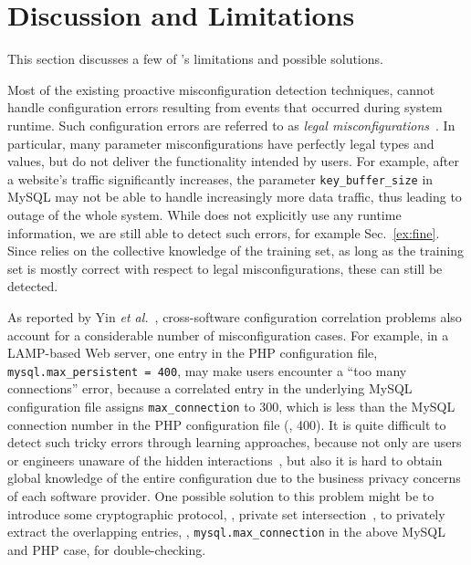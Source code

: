 
\section{Discussion and Limitations}

This section discusses a few of \app's limitations
and possible solutions.

Most of the existing proactive misconfiguration detection techniques, cannot handle configuration errors resulting from events that occurred during system runtime.
Such configuration errors are referred to as {\em legal misconfigurations}~\cite{yin11anempirical}. 
In particular, many parameter misconfigurations have perfectly legal types and values, but do not deliver the functionality intended by users. 
For example, after a website's traffic significantly increases, the parameter {\tt key\_buffer\_size} in MySQL may not  be able to handle increasingly more data traffic,
   thus leading to outage of the whole system.
While \app does not explicitly use any runtime information, we are still able to detect such errors, for example Sec.~\ref{ex:fine}.
Since \app relies on the collective knowledge of the training set, as long as the training set is mostly correct with respect to legal misconfigurations, these can still be detected.

As reported by Yin {\em et al.}~\cite{yin11anempirical},
cross-software configuration correlation problems also account
for a considerable number of misconfiguration cases.
For example, in a LAMP-based Web server, one entry in the
PHP configuration file, {\tt mysql.max\_persistent = 400},
may make users encounter a ``too many connections'' error,
because a correlated entry in the underlying MySQL configuration
file assigns {\tt max\_connection} to 300, which is less
than the MySQL connection number in the PHP configuration file (\ie, 400).
It is quite difficult to detect such tricky errors
through learning approaches, because not only are users or engineers 
unaware of the hidden interactions~\cite{xu15systems},
but also it is hard to obtain global knowledge of the entire
configuration due to the business privacy concerns of
each software provider.
One possible solution to this problem might be to introduce
some cryptographic protocol, \eg, private set
intersection~\cite{kissner05privacy}, to privately extract the
overlapping entries, \eg, {\tt mysql.max\_connection} in the 
above MySQL and PHP case, for double-checking.

